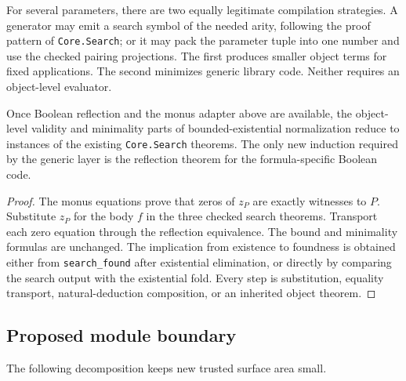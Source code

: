 For several parameters, there are two equally legitimate compilation strategies.  A generator may emit a search symbol of the needed arity, following the proof pattern of \texttt{Core.Search}; or it may pack the parameter tuple into one number and use the checked pairing projections.  The first produces smaller object terms for fixed applications.  The second minimizes generic library code.  Neither requires an object-level evaluator.

\begin{proposition}
\label{prop:checked-search-reuse}
Once Boolean reflection and the monus adapter above are available, the object-level validity and minimality parts of bounded-existential normalization reduce to instances of the existing \texttt{Core.Search} theorems.  The only new induction required by the generic layer is the reflection theorem for the formula-specific Boolean code.
\end{proposition}

\begin{proof}
The monus equations prove that zeros of \(z_P\) are exactly witnesses to \(P\).  Substitute \(z_P\) for the body \(f\) in the three checked search theorems.  Transport each zero equation through the reflection equivalence.  The bound and minimality formulas are unchanged.  The implication from existence to foundness is obtained either from \texttt{search\_found} after existential elimination, or directly by comparing the search output with the existential fold.  Every step is substitution, equality transport, natural-deduction composition, or an inherited object theorem.
\end{proof}

\subsection{Proposed module boundary}

The following decomposition keeps new trusted surface area small.

